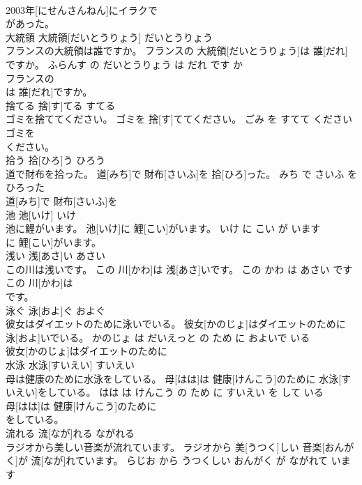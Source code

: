 \documentclass[8pt]{extreport}
\begin{document}
\begin{CJK}{UTF8}{min}
\\	2003年[にせんさんねん]にイラクで
\\	があった。			
\\	大統領	大統領[だいとうりょう]	だいとうりょう	
\\	フランスの大統領は誰ですか。	フランスの 大統領[だいとうりょう]は 誰[だれ]ですか。	ふらんす の だいとうりょう は だれ です か	
\\	フランスの
\\	は 誰[だれ]ですか。			
\\	捨てる	捨[す]てる	すてる	
\\	ゴミを捨ててください。	ゴミを 捨[す]ててください。	ごみ を すてて ください	
\\	ゴミを
\\	ください。			
\\	拾う	拾[ひろ]う	ひろう	
\\	道で財布を拾った。	道[みち]で 財布[さいふ]を 拾[ひろ]った。	みち で さいふ を ひろった	
\\	道[みち]で 財布[さいふ]を
\\	池	池[いけ]	いけ	
\\	池に鯉がいます。	池[いけ]に 鯉[こい]がいます。	いけ に こい が います	
\\	に 鯉[こい]がいます。			
\\	浅い	浅[あさ]い	あさい	
\\	この川は浅いです。	この 川[かわ]は 浅[あさ]いです。	この かわ は あさい です	
\\	この 川[かわ]は
\\	です。			
\\	泳ぐ	泳[およ]ぐ	およぐ	
\\	彼女はダイエットのために泳いでいる。	彼女[かのじょ]はダイエットのために 泳[およ]いでいる。	かのじょ は だいえっと の ため に およいで いる	
\\	彼女[かのじょ]はダイエットのために
\\	水泳	水泳[すいえい]	すいえい	
\\	母は健康のために水泳をしている。	母[はは]は 健康[けんこう]のために 水泳[すいえい]をしている。	はは は けんこう の ため に すいえい を して いる	
\\	母[はは]は 健康[けんこう]のために
\\	をしている。			
\\	流れる	流[なが]れる	ながれる	
\\	ラジオから美しい音楽が流れています。	ラジオから 美[うつく]しい 音楽[おんがく]が 流[なが]れています。	らじお から うつくしい おんがく が ながれて います	

\end{CJK}
\end{document}
